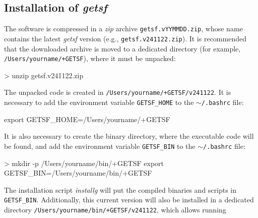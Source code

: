 \documentclass[a4paper,10pt]{article}
\begin{document}

\subsection{Installation of \textsl{getsf}}
\label{install}

The software is compressed in a \textsl{zip} archive \verb!getsf.vYYMMDD.zip!, whose name contains the latest \textsl{getsf}
version (e.g., \verb!getsf.v241122.zip!). It is recommended that the downloaded archive is moved to a dedicated directory (for
example, \verb!/Users/yourname/+GETSF!), where it must be unpacked:
\begin{verbnobox}[\mbox{}\small] 
> unzip getsf.v241122.zip
\end{verbnobox} 
The unpacked code is created in \verb!/Users/yourname/+GETSF/v241122!. It is necessary to add the environment variable
\verb!GETSF_HOME! to the $\sim$\verb!/.bashrc! file:
\begin{verbnobox}[\mbox{}\small] 
export GETSF_HOME=/Users/yourname/+GETSF
\end{verbnobox} 
It is also necessary to create the binary directory, where the executable code will be found, and add the environment variable
\verb!GETSF_BIN! to the $\sim$\verb!/.bashrc! file:
\begin{verbnobox}[\mbox{}\small] 
> mkdir -p /Users/yourname/bin/+GETSF
export GETSF_BIN=/Users/yourname/bin/+GETSF
\end{verbnobox} 
The installation script \textsl{installg} will put the compiled binaries and scripts in \verb!GETSF_BIN!. Additionally, this
current version will also be installed in a dedicated directory \verb!/Users/yourname/bin/+GETSF/v241122!, which allows running
\end{document}
